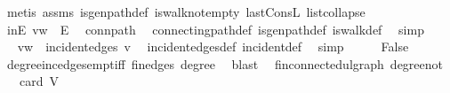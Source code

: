 \begin{isabellebody}
\ {\isacharparenleft}{\kern0pt}metis\ assms{\isacharparenleft}{\kern0pt}{}{\isacharparenright}{\kern0pt}\ is{\isacharunderscore}{\kern0pt}gen{\isacharunderscore}{\kern0pt}path{\isacharunderscore}{\kern0pt}def\ is{\isacharunderscore}{\kern0pt}walk{\isacharunderscore}{\kern0pt}not{\isacharunderscore}{\kern0pt}empty{}\ last{\isacharunderscore}{\kern0pt}ConsL\ list{\isachardot}{\kern0pt}collapse{\isacharparenright}{\kern0pt}\isanewline
\ \ \isamarkupfalse%
\ \isamarkupfalse%
\ inE{\isacharcolon}{\kern0pt}\ {\isachardoublequoteopen}{\isacharbraceleft}{\kern0pt}v{\isacharcomma}{\kern0pt}w{\isacharbraceright}{\kern0pt}\ {\isasymin}\ E{\isachardoublequoteclose}\ \isamarkupfalse%
\ conn{\isacharunderscore}{\kern0pt}path\ \isamarkupfalse%
\ connecting{\isacharunderscore}{\kern0pt}path{\isacharunderscore}{\kern0pt}def\ is{\isacharunderscore}{\kern0pt}gen{\isacharunderscore}{\kern0pt}path{\isacharunderscore}{\kern0pt}def\ is{\isacharunderscore}{\kern0pt}walk{\isacharunderscore}{\kern0pt}def\ \isamarkupfalse%
\ simp\isanewline
\ \ \isamarkupfalse%
\ \isamarkupfalse%
\ {\isachardoublequoteopen}{\isacharbraceleft}{\kern0pt}v{\isacharcomma}{\kern0pt}w{\isacharbraceright}{\kern0pt}\ {\isasymin}\ incident{\isacharunderscore}{\kern0pt}edges\ v{\isachardoublequoteclose}\ \isamarkupfalse%
\ incident{\isacharunderscore}{\kern0pt}edges{\isacharunderscore}{\kern0pt}def\ incident{\isacharunderscore}{\kern0pt}def\ \isamarkupfalse%
\ simp\isanewline
\ \ \isamarkupfalse%
\ \isamarkupfalse%
\ False\ \isamarkupfalse%
\ degree{}{\isacharunderscore}{\kern0pt}inc{\isacharunderscore}{\kern0pt}edges{\isacharunderscore}{\kern0pt}empt{\isacharunderscore}{\kern0pt}iff\ fin{\isacharunderscore}{\kern0pt}edges\ degree{\isacharunderscore}{\kern0pt}{}\ \isamarkupfalse%
\ blast\isanewline
{}\isamarkupfalse%
%
\endisatagproof
{\isafoldproof}%
%
\isadelimproof
\isanewline
%
\endisadelimproof
\isanewline
{}\isamarkupfalse%
\ {\isacharparenleft}{\kern0pt}\ fin{\isacharunderscore}{\kern0pt}connected{\isacharunderscore}{\kern0pt}ulgraph{\isacharparenright}{\kern0pt}\ degree{\isacharunderscore}{\kern0pt}not{\isacharunderscore}{\kern0pt}{}{\isacharcolon}{\kern0pt}\isanewline
\ \ \ {\isachardoublequoteopen}card\ V\ {\isasymge}\ {}{\isachardoublequoteclose}\isanewline

\end{isabellebody}
